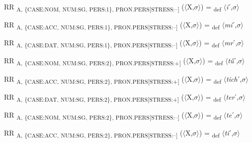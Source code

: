 {\begin{exe}
 RR \textsubscript{A, \{CASE:NOM, NUM:SG, PERS:1\}, PRON.PERS[STRESS:–]} ($\langle$X,$\sigma $$\rangle$) = \textsubscript{def} $\langle$\textit{i}ˊ,$\sigma $$\rangle$
\end{exe}

\begin{exe}
 RR \textsubscript{A, \{CASE:ACC, NUM:SG, PERS:1\}, PRON.PERS[STRESS:–]} ($\langle$X,$\sigma $$\rangle$) = \textsubscript{def} $\langle$\textit{mi}ˊ,$\sigma $$\rangle$
\end{exe}

\begin{exe}
 RR \textsubscript{A, \{CASE:DAT, NUM:SG, PERS:1\}, PRON.PERS[STRESS:–]} ($\langle$X,$\sigma $$\rangle$) = \textsubscript{def} $\langle$\textit{mr}ˊ,$\sigma $$\rangle$
\end{exe}

\begin{exe}
 RR \textsubscript{A, \{CASE:NOM, NUM:SG, PERS:2\}, PRON.PERS[STRESS:+]} ($\langle$X,$\sigma $$\rangle$) = \textsubscript{def} $\langle$\textit{tǖ}ˊ,$\sigma $$\rangle$
\end{exe}

\begin{exe}
 RR \textsubscript{A, \{CASE:ACC, NUM:SG, PERS:2\}, PRON.PERS[STRESS:+]} ($\langle$X,$\sigma $$\rangle$) = \textsubscript{def} $\langle$\textit{tich}ˊ,$\sigma $$\rangle$
\end{exe}

\begin{exe}
 RR \textsubscript{A, \{CASE:DAT, NUM:SG, PERS:2\}, PRON.PERS[STRESS:+]} ($\langle$X,$\sigma $$\rangle$) = \textsubscript{def} $\langle$\textit{ter}ˊ,$\sigma $$\rangle$
\end{exe}

\begin{exe}
 RR \textsubscript{A, \{CASE:NOM, NUM:SG, PERS:2\}, PRON.PERS[STRESS:–]} ($\langle$X,$\sigma $$\rangle$) = \textsubscript{def} $\langle$\textit{te}ˊ,$\sigma $$\rangle$
\end{exe}

\begin{exe}
 RR \textsubscript{A, \{CASE:ACC, NUM:SG, PERS:2\}, PRON.PERS[STRESS:–]} ($\langle$X,$\sigma $$\rangle$) = \textsubscript{def} $\langle$\textit{ti}ˊ,$\sigma $$\rangle$
\end{exe}

}
